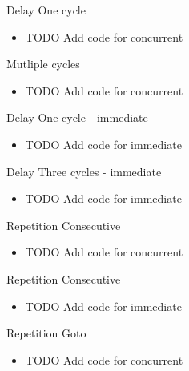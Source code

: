 \documentclass{beamer}
\begin{document}
\begin{frame}{Delay}
One cycle

\begin{itemize}
 \item TODO Add code for concurrent
\end{itemize}

Mutliple cycles
\begin{itemize}
 \item TODO Add code for concurrent
\end{itemize}
\end{frame}


\begin{frame}{Delay}
One cycle - immediate

\begin{itemize}
 \item TODO Add code for immediate
\end{itemize}
\end{frame}


\begin{frame}{Delay}
Three cycles - immediate

\begin{itemize}
 \item TODO Add code for immediate
\end{itemize}
\end{frame}


\begin{frame}{Repetition}
Consecutive

\begin{itemize}
 \item TODO Add code for concurrent
\end{itemize}
\end{frame}


\begin{frame}{Repetition}
Consecutive

\begin{itemize}
 \item TODO Add code for immediate
\end{itemize}
\end{frame}


\begin{frame}{Repetition}
Goto

\begin{itemize}
 \item TODO Add code for concurrent
\end{itemize}
\end{frame}
\end{document}
